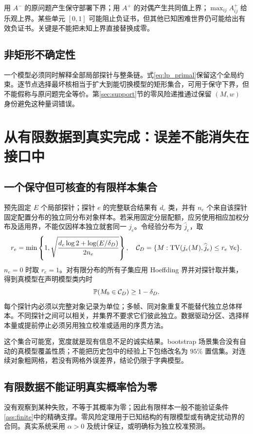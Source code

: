 \documentclass[11pt,a4paper,fontset=fandol]{ctexart}
\theoremstyle{definition}
\theoremstyle{remark}\newtheorem{remark}[theorem]{说明}
\numberwithin{equation}{section}
\newcommand{\TV}{\operatorname{TV}}\newcommand{\supp}{\operatorname{supp}}
\begin{document}
用 $A^-$ 的原问题产生保守部署下界；用 $A^+$ 的对偶产生共同值上界；$\max_{ij}A^+_{ij}$ 给乐观上界。某些单元 $[0,1]$ 可能阻止负证书，但其他已知困难世界仍可能给出有效负证书。关键是不能把未知上界直接替换成零。

\subsection{非矩形不确定性}
一个模型必须同时解释全部局部探针与整条链。式\eqref{eq:lp_primal}保留这个全局约束。逐节点选择最坏核相当于扩大到能切换模型的矩形集合，可用于保守下界，但不能假称与原问题完全等价。第\ref{sec:support}节的零风险递推通过保留 $(M,w)$ 身份避免这种量词错误。

\section{从有限数据到真实完成：误差不能消失在接口中}
\label{sec:errors}
\subsection{一个保守但可核查的有限样本集合}
预先固定 $E$ 个局部探针；探针 $e$ 的完整联合结果有 $d_e$ 类，并有 $n_e$ 个来自该探针固定配置分布的独立同分布对象样本。若采用固定分层配额，应另使用相应加权分布及适用界，不能仅因样本独立就套同一 $j_e$。令经验分布为 $\widehat j_e$，取
\begin{equation}
 r_e=\min\left\{1,\sqrt{\frac{d_e\log2+\log(E/\delta_D)}{2n_e}}\right\},
 \quad
 \cC_D=\{M:\TV(j_e(M),\widehat j_e)\le r_e\ \forall e\}.
 \label{eq:conf}
\end{equation}
$n_e=0$ 时取 $r_e=1$。对有限分布的所有子集应用 Hoeffding 界并对探针取并集，得到真模型在声明模型类内时
\begin{equation}
 \mathbb P(M_0\in\mathcal C_D)\ge1-\delta_D.
\end{equation}
每个探针内必须以完整对象记录为单位；多帧、同对象重复不能替代独立总体样本。不同探针之间可以相关，并集界不要求它们彼此独立。数据驱动分区、选择样本量或提前停止必须另用独立校准或适用的序贯方法。

这个集合可能宽，宽度就是现有信息不足的诚实结果。bootstrap 场景集合没有自动的真模型覆盖性质；不能把历史包中的经验上下包络改名为 $95\%$ 置信集。对连续对象粗网格，若没有网格外误差界，结论仍限于字典模型。

\subsection{有限数据不能证明真实概率恰为零}
没有观察到某种失败，不等于其概率为零；因此有限样本一般不能验证条件\ref{ass:finite}中的精确支撑。零风险定理用于已知结构的有限模型或有确定扰动界的合同。真实系统采用 $\alpha>0$ 及统计保证，或明确标为独立校准预测。
\end{document}

